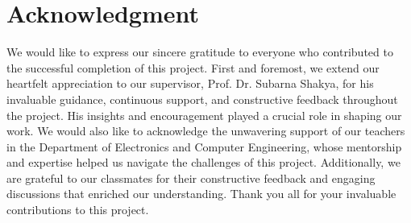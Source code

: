

\KECcoverpage
\KECtitlepage

\KECcopyright %

\KECapproval %

\chapter*{Acknowledgment}

We would like to express our sincere gratitude to everyone who contributed to the successful completion of this project.
First and foremost, we extend our heartfelt appreciation to our supervisor, Prof. Dr. Subarna Shakya, for his invaluable guidance, continuous support, and constructive feedback throughout the project. His insights and encouragement played a crucial role in shaping our work.
We would also like to acknowledge the unwavering support of our teachers in the Department of Electronics and Computer Engineering, whose mentorship and expertise helped us navigate the challenges of this project. Additionally, we are grateful to our classmates for their constructive feedback and engaging discussions that enriched our understanding.
Thank you all for your invaluable contributions to this project.

